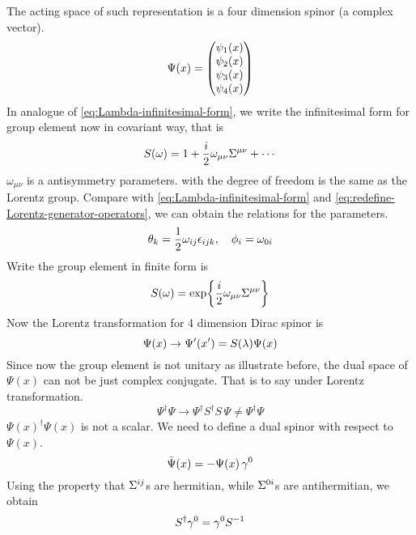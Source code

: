 The acting space of such representation is a four dimension spinor (a complex vector).
\begin{equation}
  \Psi(x) = \mqty(\psi_1(x)\\ \psi_2(x)\\ \psi_3(x)\\ \psi_4(x))
\end{equation}
In analogue of \eqref{eq:Lambda-infinitesimal-form}, we write the infinitesimal form for group element now in covariant way, that is
\begin{equation} \label{the infinitesimal form of Sla}
S(\omega) = 1+ \frac{i}{2}\omega_{\mu\nu}\Sigma^{\mu\nu}+\cdots
\end{equation}
$\omega_{\mu\nu}$ is a antisymmetry parameters. with the degree of freedom is the same as the Lorentz group. Compare with \eqref{eq:Lambda-infinitesimal-form} and \eqref{eq:redefine-Lorentz-generator-operators}, we can obtain the relations for the parameters.
\begin{equation} \label{parameter redefinition}
\theta_k = \frac{1}{2} \omega_{ij}\epsilon_{ijk}, \quad \phi_i = \omega_{0i}
\end{equation}
Write the group element in finite form is
\begin{equation} \label{the finite form of Sla}
S(\omega) = \exp{\frac{i}{2}\omega_{\mu\nu}\Sigma^{\mu\nu}}
\end{equation}
Now the Lorentz transformation for 4 dimension Dirac spinor  is
\begin{equation} \label{Lorentz transformation of Dirac spinor}
\Psi(x)\rightarrow\Psi'(x') = S(\lambda)\Psi(x)
\end{equation}
Since now the group element is not unitary as illustrate before, the dual space of $\Psi(x)$ can not be just complex conjugate. That is to say under Lorentz  transformation.
\begin{equation}
  \Psi^{\dagger} \Psi
\rightarrow
\Psi^{\dagger} S^{\dagger} S \, \Psi \neq \Psi^{\dagger} \Psi
\end{equation}
$\Psi(x)^{\dagger} \Psi(x) $ is not a scalar.
We need to define a dual spinor with respect to $\Psi(x)$.
\begin{equation} \label{definition of dual spinor}
\bar{\Psi}(x) = -\Psi(x)\,\gamma^0
\end{equation}
Using the property that $\Sigma^{ij}$s are hermitian, while $\Sigma^{0i}$s are antihermitian, we obtain
\begin{equation} \label{property of S(lambda)}
S^{\dagger} \gamma^0 = \gamma^0 S^{-1}
\end{equation}
